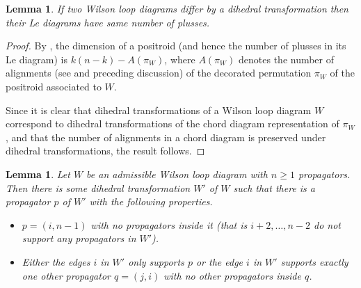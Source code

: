 \documentclass[11pt]{article}
\newtheorem{lem}[thm]{Lemma}
\theoremstyle{remark}
\theoremstyle{definition}
\begin{document}


\begin{lem}\label{lem dihedral}
If two Wilson loop diagrams differ by a dihedral transformation then their Le diagrams have same number of plusses.
\end{lem}
\begin{proof}
By \cite[Proposition 17.10]{Postnikov}, the dimension of a positroid (and hence the number of plusses in its Le diagram) is $k(n-k) - A(\pi_W)$, where $A(\pi_W)$ denotes the number of alignments (see \cite[Figure 17.1]{Postnikov} and preceding discussion) of the decorated permutation $\pi_W$ of the positroid associated to $W$. 

Since it is clear that dihedral transformations of a Wilson loop diagram $W$ correspond to dihedral transformations of the chord diagram representation of $\pi_W$, and that the number of alignments in a chord diagram is preserved under dihedral transformations, the result follows.
\end{proof}



\begin{lem}\label{lem good p}
  Let $W$ be an admissible Wilson loop diagram with $n\geq 1$ propagators.  Then there is some dihedral transformation $W'$ of $W$ such that there is a propagator $p$ of $W'$ with the following properties.
  \begin{itemize}
  \item $p = (i, n-1)$ with no propagators inside it (that is $i+2, \ldots, n-2$ do not support any propagators in $W'$).
  \item Either the edges $i$ in $W'$ only supports $p$ or the edge $i$ in $W'$ supports exactly one other propagator $q = (j ,i)$ with no other propagators inside $q$.
  \end{itemize}
\end{lem}
\end{document}

